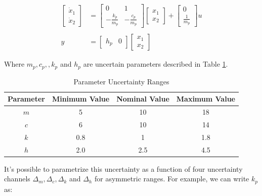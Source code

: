 \documentclass{scrreprt}
\begin{document}
\begin{equation}
    \begin{aligned}
        \begin{bmatrix}
        \dot{x}_1 \\
        \dot{x}_2
        \end{bmatrix}
        &=
        \begin{bmatrix}
        0 & 1 \\
        -\frac{k_p}{m_p} & -\frac{c_p}{m_p}
        \end{bmatrix}
        \begin{bmatrix}
        x_1 \\
        x_2
        \end{bmatrix}
        +
        \begin{bmatrix}
        0 \\
        \frac{1}{m_p}
        \end{bmatrix}
        u \\
        \\
        y &=
        \begin{bmatrix}
        h_p & 0
        \end{bmatrix}
        \begin{bmatrix}
        x_1 \\
        x_2
        \end{bmatrix}
    \end{aligned}
\end{equation}

Where $m_p, c_p, ,k_p$ and $h_p$ are uncertain parameters described in Table \ref{tab:parameters}.

\begin{table}[h]
\centering
\begin{tabular}{|c|c|c|c|}
\hline
\textbf{Parameter} & \textbf{Minimum Value} & \textbf{Nominal Value} & \textbf{Maximum Value} \\ \hline
$m$ & 5   & 10  & 18  \\ \hline
$c$ & 6   & 10  & 14  \\ \hline
$k$ & 0.8 & 1   & 1.8 \\ \hline
$h$ & 2.0 & 2.5 & 4.5 \\ \hline
\end{tabular}
\caption{Parameter Uncertainty Ranges}
\label{tab:parameters}
\end{table}

It's possible to parametrize this uncertainty as a function of four uncertainty channels $\Delta_m, \Delta_c, \Delta_k$ and $\Delta_h$ for asymmetric ranges. For example, we can write $k_p$ as:
\end{document}
